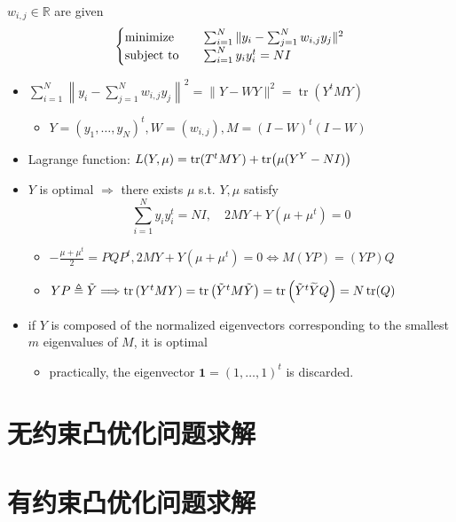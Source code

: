 \begin{remark}
    $w_{i, j} \in \mathbb{R}$ are given\[\begin{cases}
        \operatorname{minimize} \quad &\sum_{i = 1}^N\|y_i - \sum_{j = 1}^Nw_{i, j}y_j\|^2\\
        \operatorname{subject\ to} \quad &\sum_{i = 1}^N y_iy_i^t = NI
    \end{cases}\]
    \begin{itemize}
        \item $\sum_{i=1}^{N}\left\|y_{i}-\sum_{j=1}^{N} w_{i, j} y_{j}\right\|^{2}=\|Y-W Y\|^{2}=\operatorname{tr}\left(Y^{t} M Y\right)$\begin{itemize}
            \item $Y=\left(y_{1}, \ldots, y_{N}\right)^{t}, W=\left(w_{i, j}\right), M=(I-W)^{t}(I-W)$
        \end{itemize}
        \item Lagrange function: $L(Y, \mu) = \tr(T^tMY) + \tr(\mu(Y^Y - NI))$
        \item $Y$ is optimal $\Longrightarrow$ there exists $\mu$ s.t. $Y, \mu$ satisfy \[\sum_{i=1}^{N} y_{i} y_{i}^{t}=N I, \quad 2 M Y+Y\left(\mu+\mu^{t}\right)=0\]\begin{itemize}
            \item $-\frac{\mu+\mu^{t}}{2}=P Q P^{t}, 2 M Y+Y\left(\mu+\mu^{t}\right)=0 \Longleftrightarrow M(Y P)=(Y P) Q$
            \item $Y P \triangleq \tilde{Y} \Longrightarrow \tr\left(Y^{t} M Y\right)=\tr\left(\tilde{Y}^{t} M \tilde{Y}\right)=\tr\left(\tilde{Y}^{t} \widetilde{Y} Q\right)=N \tr(Q)$
        \end{itemize}
        \item if $Y$ is composed of the normalized eigenvectors corresponding to the smallest $m$ eigenvalues of $M$, it is optimal\begin{itemize}
            \item practically, the eigenvector $\mathbf{1} = (1, \dots, 1)^t$ is discarded.
        \end{itemize}
    \end{itemize}
\end{remark}


\section{无约束凸优化问题求解}
\section{有约束凸优化问题求解}

